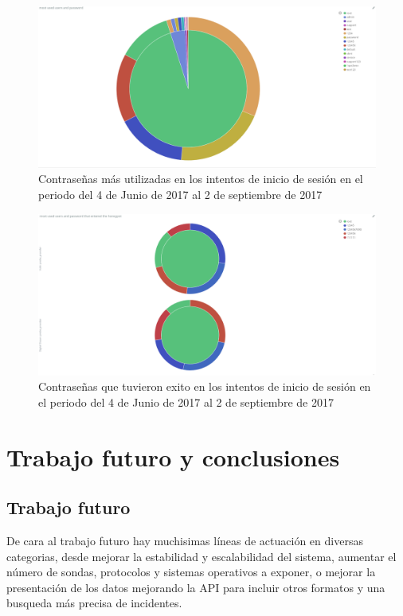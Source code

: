   \begin{figure}
    \centering
      \includegraphics[scale=0.3]{images/ElasticPiePasswors}
    \caption{Contraseñas más utilizadas en los intentos de inicio de sesión en el periodo del 4 de Junio de 2017 al 2 de septiembre de 2017}
    \label{fig:data-pie-passwords}
  \end{figure}

  \begin{figure}
    \centering
      \includegraphics[scale=0.3]{images/ElasticPiePasswordSuccessful}
    \caption{Contraseñas que tuvieron exito en los intentos de inicio de sesión en el periodo del 4 de Junio de 2017 al 2 de septiembre de 2017}
    \label{fig:data-pie-passwords-successful}
  \end{figure}
  
  
  
\chapter{Trabajo futuro y conclusiones}
\section{Trabajo futuro}

De cara al trabajo futuro hay muchisimas líneas de actuación en diversas categorias, desde mejorar la estabilidad 
y escalabilidad del sistema, aumentar el número de sondas, protocolos y sistemas operativos a exponer, o 
mejorar la presentación de los datos mejorando la API para incluir otros formatos y una busqueda más precisa de incidentes.


